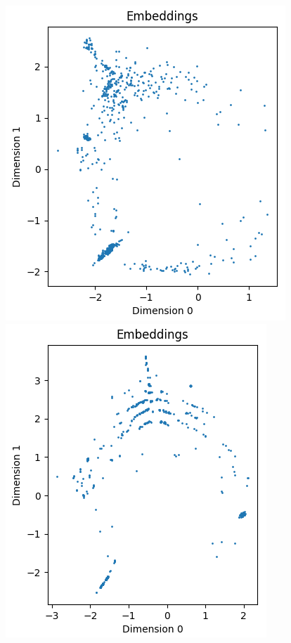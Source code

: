 \documentclass{article}
\begin{document}
\begin{figure}[ht]
  \begin{minipage}{0.5\textwidth}
    \centering
    \includegraphics[width=\linewidth]{figures/short_term.png}
  \end{minipage}%
  \begin{minipage}{0.5\textwidth}
    \centering
    \includegraphics[width=\linewidth]{figures/long_term.png}

\end{minipage}
\end{figure}
\end{document}
